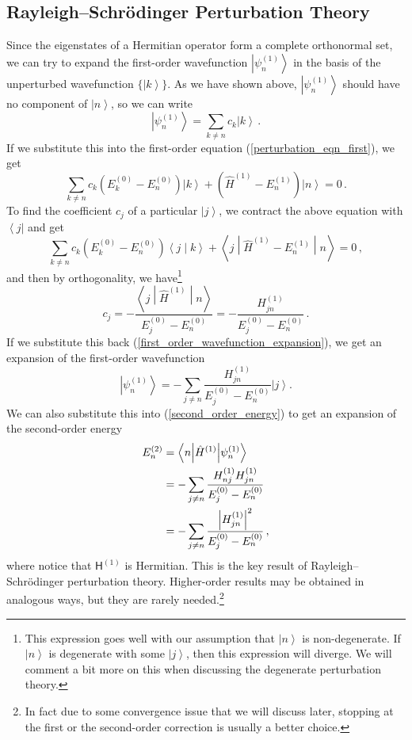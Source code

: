 \documentclass{article}
\theoremstyle{plain}\theoremheaderfont{\normalfont\itshape}\theorembodyfont{\rmfamily}\theoremseparator{.}\newtheorem*{rem}{Remark}\newtheorem*{ex}{Example}\newtheorem*{proof}{Proof}\newtheorem*{altp}{Alternative proof}
\theoremstyle{plain}\theoremheaderfont{\normalfont\bfseries}\theorembodyfont{\rmfamily}\theoremseparator{.}\newtheorem{thm}{Theorem}[section]\newtheorem{lem}[thm]{Lemma}\newtheorem{prop}[thm]{Proposition}\newtheorem*{cor}{Corollary}\newtheorem{defn}[thm]{Definition}\newtheorem{clm}[thm]{Claim}\newtheorem{clminproof}{Claim}
\theoremstyle{break}\theoremheaderfont{\normalfont\itshape}\theorembodyfont{\rmfamily}\theoremseparator{.\medskip}\newtheorem*{proofskip}{Proof}\newtheorem*{exs}{Examples}\newtheorem*{rems}{Remarks}
\theoremstyle{break}\theoremheaderfont{\normalfont\bfseries}\theorembodyfont{\rmfamily}\theoremseparator{.\medskip}\newtheorem{lemskip}[thm]{Lemma}\newtheorem{defnskip}[thm]{Definition}\newtheorem{propskip}[thm]{Proposition}\newtheorem{thmskip}[thm]{Theorem}
\numberwithin{equation}{section}
\newcommand{\bra}[1]{\left\langle #1 \right|}
\newcommand{\ket}[1]{\left| #1 \right\rangle}
\newcommand{\braket}[2]{\left\langle #1 \middle| #2 \right\rangle}
\newcommand{\mel}[3]{\left\langle #1 \middle| #2 \middle| #3 \right\rangle}
\newcommand{\abs}[1]{\left| #1 \right|}
\begin{document}
    \subsection{Rayleigh--Schr\"{o}dinger Perturbation Theory}
    Since the eigenstates of a Hermitian operator form a complete orthonormal set, we can try to expand the first-order wavefunction \(\ket{\psi_n^{(1)}}\) in the basis of the unperturbed wavefunction \(\{\ket{k}\}\). As we have shown above, \(\ket{\psi_n^{(1)}}\) should have no component of \(\ket{n}\), so we can write
    \begin{equation}\label{first_order_wavefunction_expansion}
        \ket{\psi_n^{(1)}}=\sum_{k\ne n}c_k\ket{k}\,.
    \end{equation}
    If we substitute this into the first-order equation (\ref{perturbation_eqn_first}), we get
    \begin{equation}
        \sum_{k\ne n}c_k(E_k^{(0)}-E_n^{(0)})\ket{k}+(\hat{H}^{(1)}-E_n^{(1)})\ket{n}=0\,.
    \end{equation}
    To find the coefficient \(c_j\) of a particular \(\ket{j}\), we contract the above equation with \(\bra{j}\) and get
    \begin{equation}
        \sum_{k\ne n}c_k(E_k^{(0)}-E_n^{(0)})\braket{j}{k}+\mel{j}{\hat{H}^{(1)}-E_n^{(1)}}{n}=0\,,
    \end{equation}
    and then by orthogonality, we have\footnote{This expression goes well with our assumption that \(\ket{n}\) is non-degenerate. If \(\ket{n}\) is degenerate with some \(\ket{j}\), then this expression will diverge. We will comment a bit more on this when discussing the degenerate perturbation theory.}
    \begin{equation}
        c_j=-\frac{\mel{j}{\hat{H}^{(1)}}{n}}{E_j^{(0)}-E_n^{(0)}}=-\frac{H_{jn}^{(1)}}{E_j^{(0)}-E_n^{(0)}}\,.
    \end{equation}
    If we substitute this back (\ref{first_order_wavefunction_expansion}), we get an expansion of the first-order wavefunction
    \begin{equation}\label{RS_first_order_wavefunction}
        \ket{\psi_n^{(1)}}=-\sum_{j\ne n}\frac{H_{jn}^{(1)}}{E_j^{(0)}-E_n^{(0)}}\ket{j}.
    \end{equation}
    We can also substitute this into (\ref{second_order_energy}) to get an expansion of the second-order energy
    \begin{align}
        E_n^{(2)}&=\mel{n}{\hat{H}^{(1)}}{\psi_n^{(1)}}\notag\\
        &=-\sum_{j\ne n}\frac{H_{nj}^{(1)}H_{jn}^{(1)}}{E_j^{(0)}-E_n^{(0)}}\notag\\
        &=-\sum_{j\ne n}\frac{\abs{H_{jn}^{(1)}}^2}{E_j^{(0)}-E_n^{(0)}}\,,
    \end{align}
    where notice that \(\mathsf{H}^{(1)}\) is Hermitian. This is the key result of Rayleigh--Schr\"{o}dinger perturbation theory. Higher-order results may be obtained in analogous ways, but they are rarely needed.\footnote{In fact due to some convergence issue that we will discuss later, stopping at the first or the second-order correction is usually a better choice.}
\end{document}
